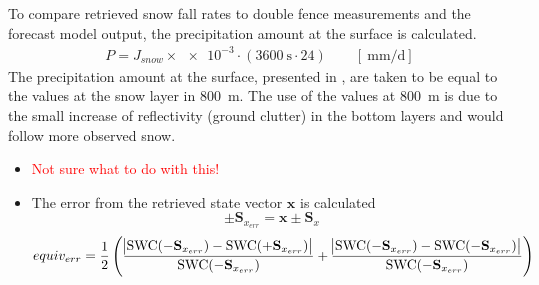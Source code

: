 To compare retrieved snow fall rates to double fence measurements and the forecast model output, the precipitation amount at the surface is calculated. 
\begin{align}
	P = J_{snow} \times \num{e-3} \cdot \left(\SI{3600}{\second} \cdot24 \right) \qquad [\SI{}{\mm\per\day}]
\end{align}
The precipitation amount at the surface, presented in , are taken to be equal to the values at the snow layer in \SI{800}{\metre}. The use of the values at \SI{800}{\metre} is due to the small increase of reflectivity (ground clutter) in the bottom layers and would follow more observed snow. 
%
\begin{itemize}
	\item \textcolor{red}{Not sure what to do with this!}
	\item The error from the retrieved state vector $\mathbf{x}$ is calculated
	$$\pm \mathbf{S}_{x_{err}} = \mathbf{x} \pm \mathbf{S}_x$$ 
	$$equiv_{err} = \frac{1}{2} \left( \frac{\abs{\text{SWC}(- \mathbf{S}_{x_{err}} ) - \text{SWC} (+ \mathbf{S}_{x_{err}}) }}{ \text{SWC}(- \mathbf{S}_{x_{err}})} + \frac{\abs{ \text{SWC}(- \mathbf{S}_{x_{err}}) - \text{SWC}(- \mathbf{S}_{x_{err}}) }}{ \text{SWC}(- \mathbf{S}_{x_{err}})} \right)$$
\end{itemize}


